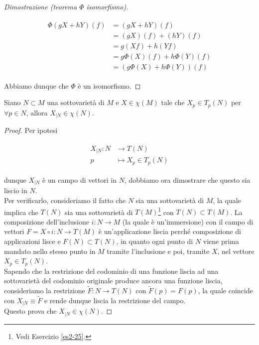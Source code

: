 \begin{proof}[Dimostrazione (teorema $ \Phi $ isomorfismo)]
\begin{itemize}
	\begin{align}
		\begin{split}
			\Phi(g X + h Y)(f) &= (g X + h Y)(f)\\
			&= (g X)(f) + (h Y)(f)\\
			&= g (X f) + h (Y f)\\
			&= g \Phi(X)(f) + h \Phi(Y)(f)\\
			&= (g \Phi(X) + h \Phi(Y))(f)
		\end{split}
	\end{align}
\end{itemize}

Abbiamo dunque che $ \Phi $ è un isomorfismo.
\end{proof}

\begin{lemma}
	Siano $ N \subset M $ una sottovarietà di $ M $ e $ X \in \chi(M) $ tale che $ X_{p} \in T_{p}(N) $ per $ \forall p \in N $, allora $ X_{|N} \in \chi(N) $.
\end{lemma}

\begin{proof}
	Per ipotesi
	
	\begin{align}
		\begin{split}
			X_{|N} : N &\to T(N)\\
			p &\mapsto X_{p} \in T_{p}(N)
		\end{split}
	\end{align}
	
	dunque $ X_{|N} $ è un campo di vettori in $ N $, dobbiamo ora dimostrare che questo sia liscio in $ N $.\\
	Per verificarlo, consideriamo il fatto che $ N $ sia una sottovarietà di $ M $, la quale implica che $ T(N) $ sia una sottovarietà di $ T(M) $\footnote{%
		Vedi Esercizio \ref{es2-25}.%
	} con $ T(N) \subset T(M) $. La composizione dell'inclusione $ i : N \to M $ (la quale è un'immersione) con il campo di vettori $ F = X \circ i : N \to T(M) $ è un'applicazione liscia perché composizione di applicazioni lisce e $ F(N) \subset T(N) $, in quanto ogni punto di $ N $ viene prima mandato nello stesso punto in $ M $ tramite l'inclusione e poi, tramite $ X $, nel vettore $ X_{p} \in T_{p}(N) $.\\
	Sapendo che la restrizione del codominio di una funzione liscia ad una sottovarietà del codominio originale produce ancora una funzione liscia, consideriamo la restrizione $ \tilde{F} : N \to T(N) $ con $ \tilde{F}(p) = F(p) $, la quale coincide con $ X_{|N} \equiv \tilde{F} $ e rende dunque liscia la restrizione del campo.\\
	Questo prova che $ X_{|N} \in \chi(N) $.
\end{proof}

